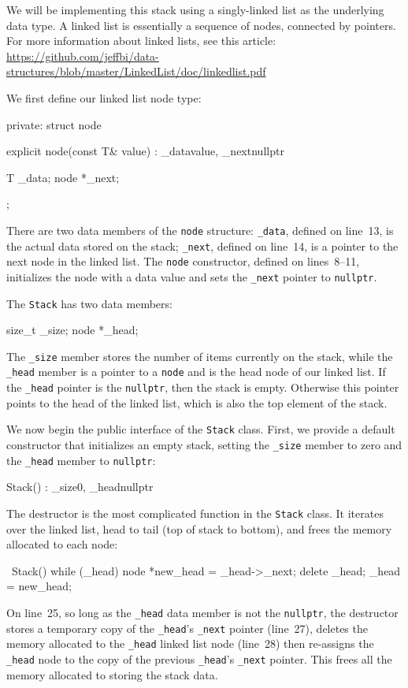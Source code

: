 \documentclass{article}
\begin{document}
  We will be implementing this stack using a singly-linked list as the underlying data type. A linked list is essentially a sequence of nodes, connected by pointers. For more information about linked lists, see this article: \url{https://github.com/jeffbi/data-structures/blob/master/LinkedList/doc/linkedlist.pdf}

  We first define our linked list node type:
\begin{lstcpp}
private:
  struct node
  {
    explicit node(const T& value)
      : _data{value},
        _next{nullptr}
    {}

    T     _data;
    node *_next;
  };\end{lstcpp}
  There are two data members of the \verb|node| structure: \verb|_data|, defined on line~13, is the actual data stored on the stack; \verb|_next|, defined on line~14, is a pointer to the next node in the linked list. The \verb|node| constructor, defined on lines~8--11, initializes the node with a data value and sets the \verb|_next| pointer to \verb|nullptr|.

  The \verb|Stack| has two data members:
  \begin{lstcpp}
  size_t  _size;
  node   *_head;\end{lstcpp}
  The \verb|_size| member stores the number of items currently on the stack, while the \verb|_head| member is a pointer to a \verb|node| and is the head node of our linked list. If the \verb|_head| pointer is the \verb|nullptr|, then the stack is empty. Otherwise this pointer points to the head of the linked list, which is also the top element of the stack.

  We now begin the public interface of the \verb|Stack| class. First, we provide a default constructor that initializes an empty stack, setting the \verb|_size| member to zero and the \verb|_head| member to \verb|nullptr|:
  \begin{lstcpp}
  Stack()
   : _size{0},
     _head{nullptr}
  {
  }\end{lstcpp}

  The destructor is the most complicated function in the \verb|Stack| class. It iterates over the linked list, head to tail (top of stack to bottom), and frees the memory allocated to each node:
  \begin{lstcpp}
  ~Stack()
  {
    while (_head)
    {
      node *new_head = _head->_next;
      delete _head;
      _head = new_head;
    }
  }\end{lstcpp}
  On line~25, so long as the \verb|_head| data member is not the \verb|nullptr|, the destructor stores a temporary copy of the \verb|_head|'s \verb|_next| pointer (line~27), deletes the memory allocated to the \verb|_head| linked list node (line~28) then re-assigns the \verb|_head| node to the copy of the previous \verb|_head|'s \verb|_next| pointer. This frees all the memory allocated to storing the stack data.
\end{document}
